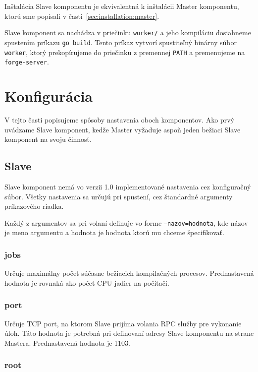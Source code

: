 Inštalácia Slave komponentu je ekvivalentná k inštalácii Master komponentu, ktorú
sme popísali v časti~\ref{sec:installation:master}.

Slave komponent sa nachádza v priečinku \texttt{worker/} a jeho kompiláciu dosiahneme
spustením príkazu \verb!go build!. Tento príkaz vytvorí spustiteľný binárny súbor
\texttt{worker}, ktorý prekopírujeme do priečinku z premennej \texttt{PATH} a premenujeme
na \texttt{forge-server}.

\section{Konfigur\'{a}cia}
\label{sec:configuration}

V tejto časti popisujeme spôsoby nastavenia oboch komponentov. Ako prvý uvádzame Slave
komponent, kedže Master vyžaduje aspoň jeden bežiaci Slave komponent na svoju činnosť.

\subsection{Slave}
\label{sec:configuration:slave}

Slave komponent nemá vo verzii 1.0 implementované nastavenia cez konfiguračný
súbor. Všetky nastavenia sa určujú pri spustení, cez štandardné argumenty príkazového
riadka.

Každý z argumentov sa pri volaní definuje vo forme \texttt{--nazov=hodnota}, kde
názov je meno argumentu a hodnota je hodnota ktorú mu chceme špecifikovať.

\subsubsection{jobs}

Určuje maximálny počet súčasne bežiacich kompilačných procesov. Prednastavená hodnota
je rovnaká ako počet CPU jadier na počítači.

\subsubsection{port}

Určuje TCP port, na ktorom Slave prijíma volania RPC služby pre vykonanie úloh.
Táto hodnota je potrebná pri definovaní adresy Slave komponentu na strane Mastera.
Prednastavená hodnota je 1103.

\subsubsection{root}

